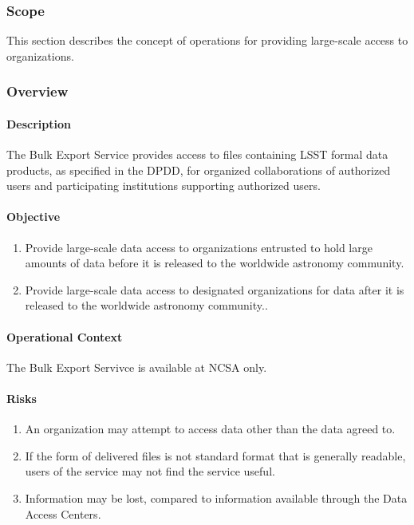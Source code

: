 ﻿\subsubsection{Scope}
This section describes the concept of operations for providing large-scale access to organizations.

\subsubsection{Overview}

\paragraph{Description}

The Bulk Export Service provides access to files containing LSST formal data products, as specified in the DPDD, for organized collaborations of authorized users and
participating institutions supporting authorized users.

\paragraph{Objective}

\begin{enumerate}

\item Provide large-scale data access to organizations entrusted to hold large
amounts of data before it is released to the worldwide astronomy community.

\item Provide large-scale data access to designated organizations for data after
it is released to the worldwide astronomy community..

\end{enumerate}

\paragraph{Operational Context}
The Bulk Export Servivce is available at NCSA only.

\paragraph{Risks}

\begin{enumerate}

\item An organization may attempt to access data other than the data agreed to.

\item If the form of delivered files is not standard format that is generally readable, users of the service may not find the
service useful.

\item Information may be lost, compared to information available through the Data Access Centers.

\end{enumerate}

